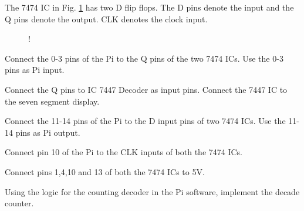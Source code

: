 %

%

%	
The 7474 IC in Fig. \ref{fig:7474} has two D flip flops.  The D pins denote the input and the Q pins denote the output. CLK denotes the clock input.
%
\begin{figure}[!h]
\begin{center}
\resizebox {\columnwidth} {!} {

}
\end{center}
\caption{}
\label{fig:7474}
\end{figure}
%


\begin{problem}
Connect the 0-3 pins of the Pi to the Q pins of the two 7474 ICs. Use the 0-3 pins as Pi input.
\end{problem}
%
\begin{problem}
Connect the Q pins to IC 7447 Decoder as input pins.  Connect the 7447 IC to the seven segment display.
\end{problem}
\begin{problem}
Connect the 11-14 pins of the Pi to the D input pins of two 7474 ICs. Use the 11-14 pins as Pi output.
\end{problem}
\begin{problem}
Connect pin 10 of the Pi to the CLK inputs of both the 7474 ICs.
\end{problem}
\begin{problem}
Connect pins 1,4,10 and 13 of both the 7474 ICs to 5V.
\end{problem}
\begin{problem}
Using the logic for the counting decoder in the Pi software, implement the decade counter.
\end{problem}

